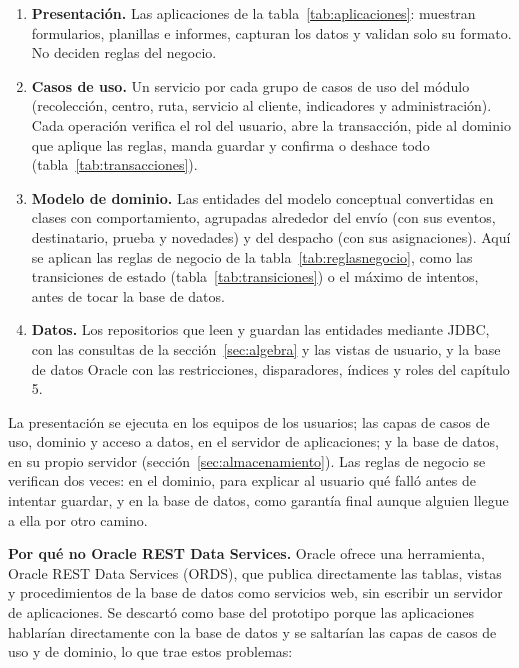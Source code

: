 \begin{enumerate}[itemsep=2pt]
  \item \textbf{Presentación.} Las aplicaciones de la
        tabla~\ref{tab:aplicaciones}: muestran formularios, planillas e
        informes, capturan los datos y validan solo su formato. No
        deciden reglas del negocio.
  \item \textbf{Casos de uso.} Un servicio por cada grupo de casos de
        uso del módulo (recolección, centro, ruta, servicio al cliente,
        indicadores y administración). Cada operación verifica el rol
        del usuario, abre la transacción, pide al dominio que aplique las
        reglas, manda guardar y confirma o deshace todo
        (tabla~\ref{tab:transacciones}).
  \item \textbf{Modelo de dominio.} Las entidades del modelo conceptual
        convertidas en clases con comportamiento, agrupadas alrededor
        del envío (con sus eventos, destinatario, prueba y novedades) y
        del despacho (con sus asignaciones). Aquí se aplican las reglas
        de negocio de la tabla~\ref{tab:reglasnegocio}, como las
        transiciones de estado (tabla~\ref{tab:transiciones}) o el
        máximo de intentos, antes de tocar la base de datos.
  \item \textbf{Datos.} Los repositorios que leen y guardan las entidades
        mediante JDBC, con las consultas de la sección~\ref{sec:algebra}
        y las vistas de usuario, y la base de datos Oracle con las
        restricciones, disparadores, índices y roles del capítulo 5.
\end{enumerate}

La presentación se ejecuta en los equipos de los usuarios; las capas de
casos de uso, dominio y acceso a datos, en el servidor de aplicaciones;
y la base de datos, en su propio servidor (sección~\ref{sec:almacenamiento}).
Las reglas de negocio se verifican dos veces: en el dominio, para
explicar al usuario qué falló antes de intentar guardar, y en la base de
datos, como garantía final aunque alguien llegue a ella por otro camino.

\textbf{Por qué no Oracle REST Data Services.} Oracle ofrece una
herramienta, Oracle REST Data Services (ORDS), que publica directamente
las tablas, vistas y procedimientos de la base de datos como servicios
web, sin escribir un servidor de aplicaciones. Se descartó como base del
prototipo porque las aplicaciones hablarían directamente con la base de
datos y se saltarían las capas de casos de uso y de dominio, lo que trae
estos problemas:

